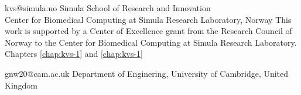 

             {kvs@simula.no}
             {Simula School of Research and Innovation \\
              Center for Biomedical Computing at Simula Research Laboratory, Norway}
             {This work is supported by a Center of Excellence grant
              from the Research Council of Norway to the Center for
              Biomedical Computing at Simula Research Laboratory.}
             {Chapters \ref{chap:kvs-1} and \ref{chap:kvs-1}}


             {gnw20@cam.ac.uk}
             {Department of Enginering, University of Cambridge, United Kingdom}
             {}
             {}


